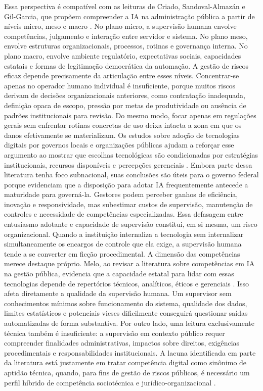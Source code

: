 \documentclass[12pt,a4paper]{article}
\begin{document}
Essa perspectiva é compatível com as leituras de Criado, Sandoval-Almazán e Gil-Garcia, que propõem compreender a IA na administração pública a partir de níveis micro, meso e macro \autocite{criado2024artificial}. No plano micro, a supervisão humana envolve competências, julgamento e interação entre servidor e sistema. No plano meso, envolve estruturas organizacionais, processos, rotinas e governança interna. No plano macro, envolve ambiente regulatório, expectativas sociais, capacidades estatais e formas de legitimação democrática da automação. A gestão de riscos eficaz depende precisamente da articulação entre esses níveis. Concentrar-se apenas no operador humano individual é insuficiente, porque muitos riscos derivam de decisões organizacionais anteriores, como contratação inadequada, definição opaca de escopo, pressão por metas de produtividade ou ausência de padrões institucionais para revisão. Do mesmo modo, focar apenas em regulações gerais sem enfrentar rotinas concretas de uso deixa intacta a zona em que os danos efetivamente se materializam.
Os estudos sobre adoção de tecnologias digitais por governos locais e organizações públicas ajudam a reforçar esse argumento ao mostrar que escolhas tecnológicas são condicionadas por estratégias institucionais, recursos disponíveis e percepções gerenciais \autocite{yiitcanlar2022artificial} \autocite{david2023understanding}. Embora parte dessa literatura tenha foco subnacional, suas conclusões são úteis para o governo federal porque evidenciam que a disposição para adotar IA frequentemente antecede a maturidade para governá-la. Gestores podem perceber ganhos de eficiência, inovação e responsividade, mas subestimar custos de supervisão, manutenção de controles e necessidade de competências especializadas. Essa defasagem entre entusiasmo adotante e capacidade de supervisão constitui, em si mesma, um risco organizacional. Quando a instituição internaliza a tecnologia sem internalizar simultaneamente os encargos de controle que ela exige, a supervisão humana tende a se converter em ficção procedimental.
A dimensão das competências merece destaque próprio. Melo, ao revisar a literatura sobre competências em IA na gestão pública, evidencia que a capacidade estatal para lidar com essas tecnologias depende de repertórios técnicos, analíticos, éticos e gerenciais \autocite{melo2026competencias}. Isso afeta diretamente a qualidade da supervisão humana. Um supervisor sem conhecimentos mínimos sobre funcionamento do sistema, qualidade dos dados, limites estatísticos e potenciais vieses dificilmente conseguirá questionar saídas automatizadas de forma substantiva. Por outro lado, uma leitura exclusivamente técnica também é insuficiente: a supervisão em contexto público requer compreender finalidades administrativas, impactos sobre direitos, exigências procedimentais e responsabilidades institucionais. A lacuna identificada em parte da literatura está justamente em tratar competência digital como sinônimo de aptidão técnica, quando, para fins de gestão de riscos públicos, é necessário um perfil híbrido de competência sociotécnica e jurídico-organizacional \autocite{melo2026competencias} \autocite{criado2024artificial}.
\end{document}
